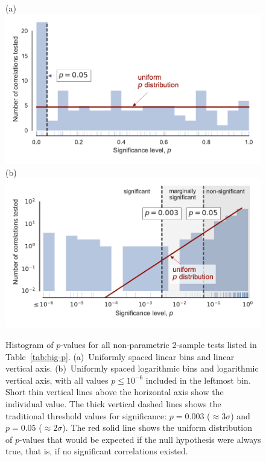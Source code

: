 \begin{figure}
  (a)\\
  \includegraphics[width=\linewidth]{figs/p-value-histogram-new-linear}\\
  (b)\\
  \includegraphics[width=\linewidth]{figs/p-value-histogram-new}
  \caption{Histogram of \(p\)-values for all non-parametric 2-sample
    tests listed in Table~\ref{tab:big-p}. (a)~Uniformly spaced linear
    bins and linear vertical axis. (b)~Uniformly spaced logarithmic
    bins and logarithmic vertical axis, with all values
    \(p \le 10^{-6}\) included in the leftmost bin.  Short thin vertical
    lines above the horizontal axis show the individual value.  The
    thick vertical dashed lines shows the traditional threshold values
    for significance: \(p = 0.003\) (\(\approx 3 \sigma\)) and
    \(p = 0.05\) (\(\approx 2 \sigma\)). The red solid line shows the uniform
    distribution of \(p\)-values that would be expected if the null
    hypothesis were always true, that is, if no significant
    correlations existed.}
  \label{fig:histo-p-values}
\end{figure}


